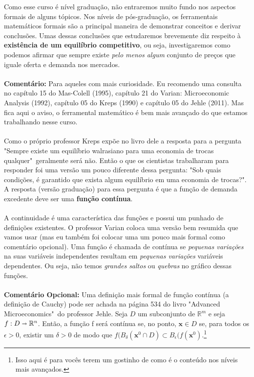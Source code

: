 \documentclass[a4paper,11pt,oneside]{book}
\theoremstyle{definition}
\theoremstyle{break}
\begin{document}
Como esse curso é nível graduação, não entraremos muito fundo nos aspectos formais de alguns tópicos. Nos níveis de pós-graduação, os ferramentais matemáticos formais são a principal maneira de demonstrar conceitos e derivar conclusões. Umas dessas conclusões que estudaremos brevemente diz respeito à \textbf{existência de um equilíbrio competitivo}, ou seja, investigaremos como podemos afirmar que sempre existe \textit{pelo menos algum} conjunto de preços que iguale oferta e demanda nos mercados.
\\~\\
\textbf{Comentário:} Para aqueles com mais curiosidade. Eu recomendo uma consulta no capítulo 15 do Mas-Colell (1995), capítulo 21 do Varian: Microeconomic Analysis (1992), capítulo 05 do Kreps (1990) e capítulo 05 do Jehle (2011). Mas fica aqui o aviso, o ferramental matemático é bem mais avançado do que estamos trabalhando nesse curso.
\\~\\
Como o próprio professor Kreps expõe no livro dele a resposta para a pergunta "Sempre existe um equilíbrio walrasiano para uma economia de trocas qualquer"\ geralmente será não. Então o que os cientistas trabalharam para responder foi uma versão um pouco diferente dessa pergunta: "Sob quais condições, é garantido que exista algum equilíbrio em uma economia de trocas?". A resposta (versão graduação) para essa pergunta é que a função de demanda excedente deve ser uma \textbf{função contínua}.
\\~\\
A continuidade é uma característica das funções e possui um punhado de definições existentes. O professor Varian coloca uma versão bem resumida que vamos usar (mas eu também foi colocar uma um pouco mais formal como comentário opcional). Uma função é chamada de contínua se \textit{pequenas variações} na suas variáveis independentes resultam em \textit{pequenas variações} variáveis dependentes. Ou seja, não temos \textit{grandes saltos} ou \textit{quebras} no gráfico dessas funções.
\\~\\
\textbf{Comentário Opcional:} Uma definição mais formal de função contínua (a definição de Cauchy) pode ser achada na página 534 do livro "Advanced Microeconomics"\ do professor Jehle. Seja $D$ um subconjunto de $\mathbb{R}^m$ e seja $f : D \shortrightarrow \mathbb{R}^n$. Então, a função f será contínua se, no ponto, $\mathbf{x} \in D$ se, para todos os $\epsilon > 0$, existir um $\delta >0$ de modo que $f(B_{\delta}(\mathbf{x}^0 \cap D) \subset B_{\epsilon}(f(\mathbf{x}^0)$.\footnote{Isso aqui é para vocês terem um gostinho de como é o conteúdo nos níveis mais avançados.}
\end{document}
